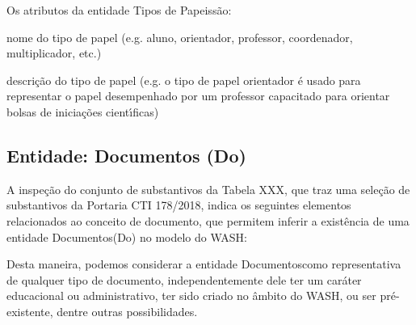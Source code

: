 \documentclass[
12pt,		%
openright,	%
twoside,  %
a4paper,			%
chapter=TITLE,		%
english,			%
french,				%
spanish,			%
brazil				%
]{USPSC-classe/USPSC}
\begin{document}
Os atributos da entidade \textquotedbl Tipos de Papeis\textquotedbl  s\~ao:





\begin{alineas}
\item nome do tipo de papel (e.g. aluno, orientador, professor, coordenador, multiplicador, etc.)
\item descri\c{c}\~ao do tipo de papel (e.g. \textquotedbl o tipo de papel orientador \'e usado para representar o papel desempenhado por um professor capacitado para orientar bolsas de inicia\c{c}\~oes cient\'{\i}ficas\textquotedbl )
\end{alineas}

\subsection[Entidade: Documentos (Do)]{Entidade: Documentos (Do)}\label{Entidade: Documentos (Do)}
A inspe\c{c}\~ao do conjunto de substantivos da Tabela XXX, que traz uma sele\c{c}\~ao de substantivos da Portaria CTI 178/2018, indica os seguintes elementos relacionados ao conceito de \textquotedbl documento\textquotedbl , que permitem inferir a exist\^encia de uma entidade \textquotedbl Documentos\textquotedbl  (Do) no modelo do WASH:





\noindent\begin{center}\mbox{\centering{}}\end{center}


Desta maneira, podemos considerar a entidade \textquotedbl Documentos\textquotedbl  como representativa de qualquer tipo de documento, independentemente dele ter um car\'ater educacional ou administrativo, ter sido criado no \^ambito do WASH, ou ser pr\'e-existente, dentre outras possibilidades.
\end{document}
